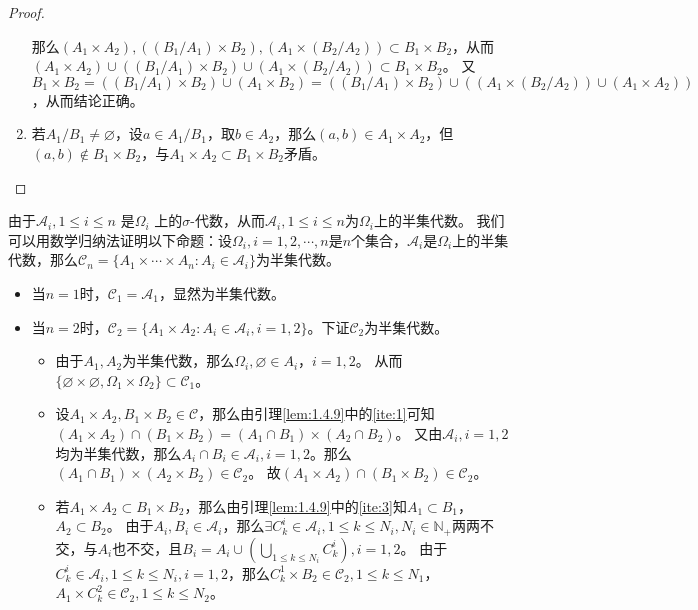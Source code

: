 \documentclass{ctexart}
\begin{document}
\begin{solution}
\begin{proof}
\begin{enumerate}
       那么\((A_1 \times A_2) , ((B_1 / A_1) \times B_2) , (A_1 \times (B_2 / A_2)) \subset B_1 \times B_2\)，从而\( (A_1 \times A_2) \cup ((B_1 / A_1) \times B_2) \cup (A_1 \times (B_2 / A_2)) \subset B_1 \times B_2 \)。
       又\(B_1 \times B_2 =((B_1 /A_1) \times B_2)\cup (A_1 \times B_2) =((B_1 /A_1) \times B_2) \cup ((A_1 \times (B_2 / A_2)) \cup (A_1 \times A_2))  \)，从而结论正确。
     \item 若\(A_1 / B_1 \neq \varnothing \)，设\(a \in A_1/B_1 \)，取\(b \in A_2 \)，那么\((a,b) \in A_1 \times A_2 \)，但\((a,b) \notin B_1 \times B_2  \)，与\(A_1 \times A_2 \subset B_1 \times B_2 \)矛盾。
   \end{enumerate}
 \end{proof}
由于\(\mathcal{A}_i,1 \leq i \leq n \) 是\(\Omega_i \)  上的\(\sigma \)-代数，从而\(\mathcal{A}_i,1 \leq i \leq n \)为\(\Omega_i \)上的半集代数。
我们可以用数学归纳法证明以下命题：设\(\Omega_i ,i=1,2,\cdots,n\)是\(n \)个集合，\(\mathcal{A}_i \)是\(\Omega_i \)上的半集代数，那么\(\mathcal{C}_n=\{A_1 \times \cdots \times A_n:A_i \in \mathcal{A}_i\} \)为半集代数。
\begin{itemize}
  \item 当\(n=1 \)时，\(\mathcal{C}_1=\mathcal{A}_1 \)，显然为半集代数。
  \item 当\(n=2 \)时，\(\mathcal{C}_2=\{A_1 \times A_2: A_i \in \mathcal{A}_i,i=1,2\} \)。下证\(\mathcal{C}_2 \)为半集代数。
    \begin{itemize}
      \item 由于\(A_1,A_2 \)为半集代数，那么\(\Omega_i, \varnothing \in A_i，i=1,2\)。
    从而\(\{\varnothing \times \varnothing , \Omega_1 \times \Omega_2\} \subset \mathcal{C}_1 \)。
  \item 设\(A_1 \times A_2, B_1 \times B_2 \in \mathcal{C} \)，那么由引理\ref{lem:1.4.9}中的\ref{ite:1}可知 \((A_1 \times A_2) \cap (B_1 \times B_2)=(A_1 \cap B_1) \times (A_2 \cap  B_2) \)。
    又由\(\mathcal{A}_i,i=1,2 \)均为半集代数，那么\(A_i \cap B_i \in \mathcal{A}_i, i=1,2 \)。那么\((A_1 \cap B_1) \times (A_2 \times B_2) \in \mathcal{C}_2  \)。
    故\((A_1 \times A_2) \cap (B_1 \times B_2) \in \mathcal{C}_2 \)。
  \item 若\(A_1 \times A_2 \subset B_1 \times B_2 \)，那么由引理\ref{lem:1.4.9}中的\ref{ite:3}知\(A_1 \subset B_1 \)，\(A_2 \subset B_2 \)。
    由于\(A_i, B_i \in \mathcal{A}_i\)，那么\(\exists C^i_k \in \mathcal{A}_i,1 \leq k \leq N_i, N_i \in \mathbb{N}_{+} \)两两不交，与\(A_i \)也不交，且\(B_i=A_i \cup (\bigcup_{1 \leq k \leq N_i} C^i_k),i=1,2\)。
    由于\(C^i_k \in \mathcal{A}_i, 1 \leq k \leq N_i,i=1,2\)，那么\(C^1_k \times B_2 \in \mathcal{C}_2, 1 \leq k \leq N_1 \)， \(A_1 \times C^2_k \in \mathcal{C}_2, 1 \leq k \leq N_2 \)。

\end{itemize}
\end{itemize}
\end{solution}
\end{document}
